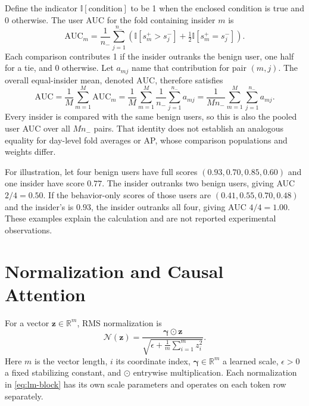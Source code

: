\documentclass[12pt]{report}
\begin{document}
Define the indicator $\mathbb I[\text{condition}]$ to be
1 when the enclosed condition is true and 0 otherwise.
The user AUC for the fold containing insider $m$ is
\begin{equation}
\mathrm{AUC}_m=\frac{1}{n_-}\sum_{j=1}^{n_-}
\left(\mathbb I[s_m^+>s_j^-]
 +\tfrac12\mathbb I[s_m^+=s_j^-]\right).
\label{eq:auc}
\end{equation}
Each comparison contributes 1 if the insider outranks the
benign user, one half for a tie, and 0 otherwise. Let
$a_{mj}$ name that contribution for pair $(m,j)$.
The overall equal-insider mean, denoted $\mathrm{AUC}$,
therefore satisfies
\[
\mathrm{AUC}
 =\frac{1}{M}\sum_{m=1}^{M}\mathrm{AUC}_m
 =\frac{1}{M}\sum_{m=1}^{M}
     \frac{1}{n_-}\sum_{j=1}^{n_-}a_{mj}
 =\frac{1}{Mn_-}\sum_{m=1}^{M}\sum_{j=1}^{n_-}a_{mj}.
\]
Every insider is compared with the same benign users,
so this is also the pooled user AUC over all $Mn_-$ pairs.
That identity does not establish an analogous equality for
day-level fold averages or AP, whose comparison populations
and weights differ.

For illustration, let four benign users have full scores
$(0.93,0.70,0.85,0.60)$ and one insider have score $0.77$.
The insider outranks two benign users, giving AUC $2/4=0.50$.
If the behavior-only scores of those users are
$(0.41,0.55,0.70,0.48)$ and the insider's is $0.93$,
the insider outranks all four, giving AUC $4/4=1.00$.
These examples explain the calculation and are not reported
experimental observations.

\section{Normalization and Causal Attention}
\label{sec:lm-block-details}
For a vector $\mathbf z\in\mathbb R^m$, RMS normalization is
\begin{equation}
\mathcal N(\mathbf z)=
\frac{\boldsymbol\gamma\odot\mathbf z}
{\sqrt{\epsilon+\frac1m\sum_{i=1}^{m}z_i^2}}.
\label{eq:lm-rmsnorm}
\end{equation}
Here $m$ is the vector length, $i$ its coordinate index,
$\boldsymbol\gamma\in\mathbb R^m$ a learned scale,
$\epsilon>0$ a fixed stabilizing constant, and $\odot$ entrywise
multiplication. Each normalization in \eqref{eq:lm-block} has its
own scale parameters and operates on each token row separately.
\end{document}
